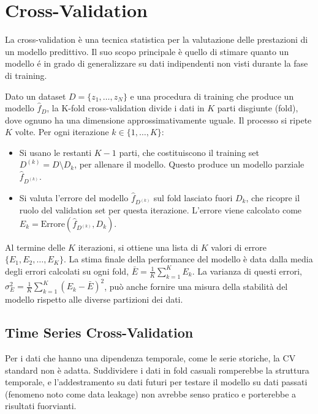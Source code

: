 \documentclass[a4paper,12pt]{report}
\begin{document}
	\section{Cross-Validation}
	
	La cross-validation è una tecnica statistica per la valutazione delle prestazioni di un modello predittivo. Il suo scopo principale è quello di stimare quanto un modello é in grado di generalizzare su dati indipendenti non visti durante la fase di training.
	
	Dato un dataset $D = \{z_1, \dots, z_N\}$ e una procedura di training che produce un modello $\hat f_{D}$, la K-fold cross-validation divide i dati in $K$ parti disgiunte (fold), dove ognuno ha una dimensione approssimativamente uguale. Il processo si ripete $K$ volte. Per ogni iterazione $k \in \{1, \dots, K\}$:
	
	\begin{itemize}
		\item Si usano le restanti $K-1$ parti, che costituiscono il training set $D^{(k)} = D \setminus D_k$, per allenare il modello. Questo produce un modello parziale $\hat f_{D^{(k)}}$.
		\item Si valuta l'errore del modello $\hat f_{D^{(k)}}$ sul fold lasciato fuori $D_k$, che ricopre il ruolo del validation set per questa iterazione. L'errore viene calcolato come $E_k = \text{Errore}(\hat f_{D^{(k)}}, D_k)$.
	\end{itemize}
	
	Al termine delle $K$ iterazioni, si ottiene una lista di $K$ valori di errore $\{E_1, E_2, \dots, E_K\}$. La stima finale della performance del modello è data dalla media degli errori calcolati su ogni fold, $\bar{E} = \frac{1}{K} \sum_{k=1}^K E_k$. La varianza di questi errori, $\sigma^2_E = \frac{1}{K} \sum_{k=1}^K (E_k - \bar{E})^2$, può anche fornire una misura della stabilità del modello rispetto alle diverse partizioni dei dati.
	
	\subsection{Time Series Cross-Validation}
	
	Per i dati che hanno una dipendenza temporale, come le serie storiche, la CV standard non è adatta. Suddividere i dati in fold casuali romperebbe la struttura temporale, e l'addestramento su dati futuri per testare il modello su dati passati (fenomeno noto come data leakage) non avrebbe senso pratico e porterebbe a risultati fuorvianti.
	
\end{document}
